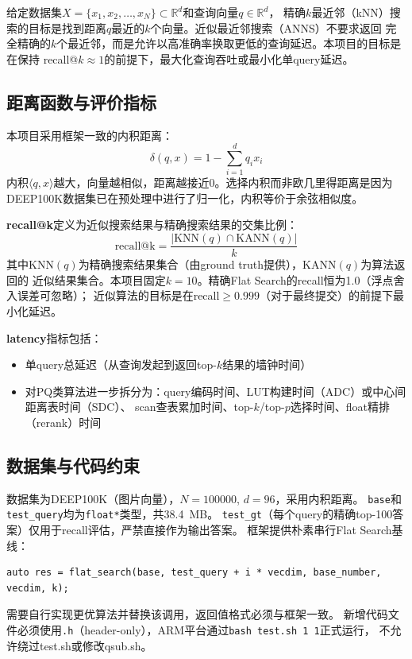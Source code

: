 \documentclass[11pt,a4paper]{article}
\begin{document}
给定数据集$X = \{x_1, x_2, \ldots, x_N\} \subset \mathbb{R}^d$和查询向量$q \in \mathbb{R}^d$，
精确$k$最近邻（kNN）搜索的目标是找到距离$q$最近的$k$个向量。近似最近邻搜索（ANNS）不要求返回
完全精确的$k$个最近邻，而是允许以高准确率换取更低的查询延迟。本项目的目标是在保持
recall@$k\approx 1$的前提下，最大化查询吞吐或最小化单query延迟。

\subsection{距离函数与评价指标}

本项目采用框架一致的内积距离：
\begin{equation}
\delta(q, x) = 1 - \sum_{i=1}^{d} q_i x_i \label{eq:ip}
\end{equation}
内积$\langle q, x\rangle$越大，向量越相似，距离越接近0。选择内积而非欧几里得距离是因为
DEEP100K数据集已在预处理中进行了归一化，内积等价于余弦相似度。

\textbf{recall@k}定义为近似搜索结果与精确搜索结果的交集比例：
\begin{equation}
\text{recall@k} = \frac{|\text{KNN}(q) \cap \text{KANN}(q)|}{k}
\end{equation}
其中$\text{KNN}(q)$为精确搜索结果集合（由ground truth提供），$\text{KANN}(q)$为算法返回的
近似结果集合。本项目固定$k=10$。精确Flat Search的recall恒为1.0（浮点舍入误差可忽略）；
近似算法的目标是在recall$\ge 0.999$（对于最终提交）的前提下最小化延迟。

\textbf{latency}指标包括：
\begin{itemize}[nosep]
    \item 单query总延迟（从查询发起到返回top-$k$结果的墙钟时间）
    \item 对PQ类算法进一步拆分为：query编码时间、LUT构建时间（ADC）或中心间距离表时间（SDC）、
          scan查表累加时间、top-$k$/top-$p$选择时间、float精排（rerank）时间
\end{itemize}

\subsection{数据集与代码约束}

数据集为DEEP100K（图片向量），$N=100000$, $d=96$，采用内积距离。
\texttt{base}和\texttt{test\_query}均为\texttt{float*}类型，共38.4~MB。
\texttt{test\_gt}（每个query的精确top-100答案）仅用于recall评估，严禁直接作为输出答案。
框架提供朴素串行Flat Search基线：
\begin{lstlisting}
auto res = flat_search(base, test_query + i * vecdim, base_number, vecdim, k);
\end{lstlisting}
需要自行实现更优算法并替换该调用，返回值格式必须与框架一致。
新增代码文件必须使用\texttt{.h}（header-only），ARM平台通过\texttt{bash test.sh 1 1}正式运行，
不允许绕过test.sh或修改qsub.sh。
\end{document}
